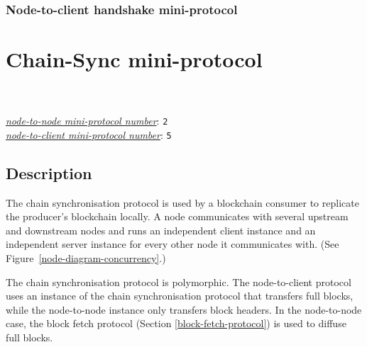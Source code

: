 \subsubsection{Node-to-client handshake mini-protocol}
\label{sec:nodetoclientcddl}


\section{Chain-Sync mini-protocol}
\label{chain-sync-protocol}
\\
\\
\hyperref[table:node-to-node-protocol-numbers]{\textit{node-to-node mini-protocol number}}: \texttt{2}\\
\hyperref[table:node-to-client-protocol-numbers]{\textit{node-to-client mini-protocol number}}: \texttt{5}\\

\newcommand{\StCanAwait}{\state{StCanAwait}}
\newcommand{\StMustReply}{\state{StMustReply}}
\newcommand{\StIntersect}{\state{StIntersect}}
\newcommand{\MsgRequestNext}{\msg{MsgRequestNext}}
\newcommand{\MsgAwaitReply}{\msg{MsgAwaitReply}}
\newcommand{\MsgRollForward}{\msg{MsgRollForward}}
\newcommand{\MsgRollBackward}{\msg{MsgRollBackward}}
\newcommand{\MsgFindIntersect}{\msg{MsgFindIntersect}}
\newcommand{\MsgIntersectFound}{\msg{MsgIntersectFound}}
\newcommand{\MsgIntersectNotFound}{\msg{MsgIntersectNotFound}}

\subsection{Description}
The chain synchronisation protocol is used by a blockchain consumer
to replicate the producer's blockchain locally.
A node communicates with several upstream and downstream nodes
and runs an independent client instance and an independent server instance for every
other node it communicates with.
(See Figure~\ref{node-diagram-concurrency}.)

The chain synchronisation protocol is polymorphic.
The node-to-client protocol uses an instance of the chain synchronisation protocol
that transfers full blocks, while the node-to-node instance only transfers block headers.
In the node-to-node case, the block fetch protocol (Section \ref{block-fetch-protocol})
is used to diffuse full blocks.

